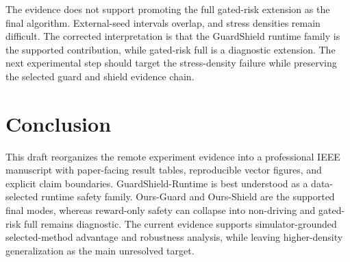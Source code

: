 \documentclass[conference,a4paper]{IEEEtran}
\newcommand{\method}{GuardShield-Runtime}
\begin{document}
The evidence does not support promoting the full gated-risk extension as the final algorithm. External-seed intervals overlap, and stress densities remain difficult. The corrected interpretation is that the GuardShield runtime family is the supported contribution, while gated-risk full is a diagnostic extension. The next experimental step should target the stress-density failure while preserving the selected guard and shield evidence chain.
\section{Conclusion}
This draft reorganizes the remote experiment evidence into a professional IEEE manuscript with paper-facing result tables, reproducible vector figures, and explicit claim boundaries. \method{} is best understood as a data-selected runtime safety family. Ours-Guard and Ours-Shield are the supported final modes, whereas reward-only safety can collapse into non-driving and gated-risk full remains diagnostic. The current evidence supports simulator-grounded selected-method advantage and robustness analysis, while leaving higher-density generalization as the main unresolved target.
\FloatBarrier


\end{document}
